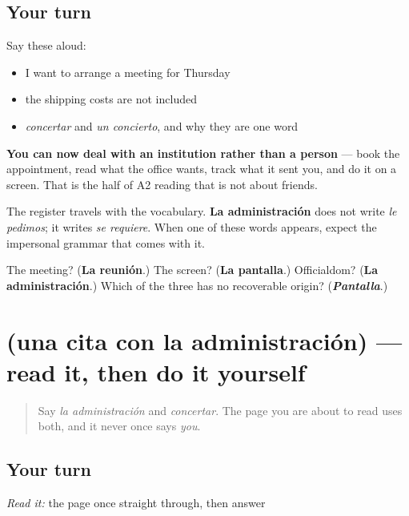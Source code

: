 \subsection*{Your turn}
Say these aloud:

\begin{itemize}
\raggedright
  \item I want to arrange a meeting for Thursday
  \item the shipping costs are not included
  \item \emph{concertar} and \emph{un concierto}, and why they are one word
\end{itemize}

\begin{grammarlens}[title={What you've built}]
\textbf{You can now deal with an institution rather than a person} — book the appointment, read what the office wants, track what it sent you, and do it on a screen. That is the half of A2 reading that is not about friends.

The register travels with the vocabulary. \textbf{La administración} does not write \emph{le pedimos}; it writes \emph{se requiere}. When one of these words appears, expect the impersonal grammar that comes with it.
\end{grammarlens}

\begin{tcolorbox}[breakable,colback=teal!4,colframe=teal!35!black,title={Before you move on}]
The meeting? (\textbf{La reunión}.) The screen? (\textbf{La pantalla}.) Officialdom? (\textbf{La administración}.) Which of the three has no recoverable origin? (\emph{\textbf{Pantalla}}.)
\end{tcolorbox}
\section[Practice]{(una cita con la administración) — read it, then do it yourself}

\label{lesson:ES-C442-sintesis-gestion}



\begin{quote}
Say \emph{la administración} and \emph{concertar}. The page you are about to read uses both, and it never once says \emph{you}.
\end{quote}

\subsection*{Your turn}
\emph{Read it:} the page once straight through, then answer

